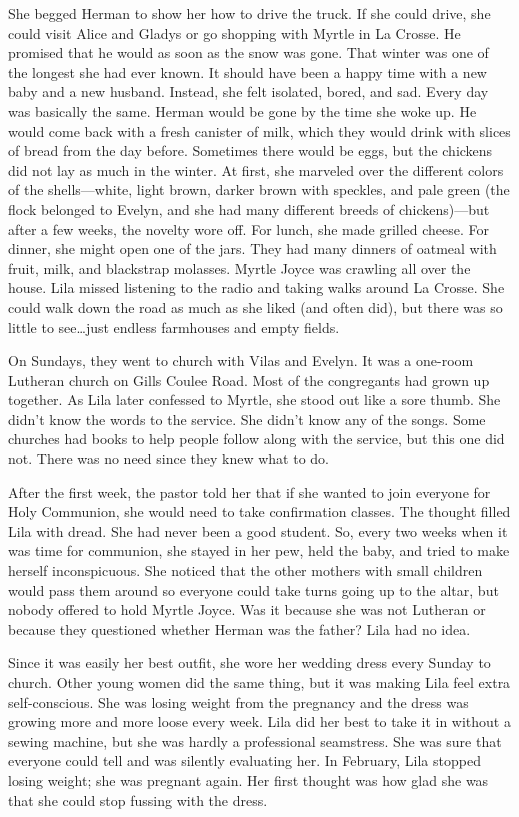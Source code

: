 \documentclass[
  letterpaper,
]{book}
\begin{document}
She begged Herman to show her how to drive the truck. If she could
drive, she could visit Alice and Gladys or go shopping with Myrtle in La
Crosse. He promised that he would as soon as the snow was gone. That
winter was one of the longest she had ever known. It should have been a
happy time with a new baby and a new husband. Instead, she felt
isolated, bored, and sad. Every day was basically the same. Herman would
be gone by the time she woke up. He would come back with a fresh
canister of milk, which they would drink with slices of bread from the
day before. Sometimes there would be eggs, but the chickens did not lay
as much in the winter. At first, she marveled over the different colors
of the shells---white, light brown, darker brown with speckles, and pale
green (the flock belonged to Evelyn, and she had many different breeds
of chickens)---but after a few weeks, the novelty wore off. For lunch,
she made grilled cheese. For dinner, she might open one of the jars.
They had many dinners of oatmeal with fruit, milk, and blackstrap
molasses. Myrtle Joyce was crawling all over the house. Lila missed
listening to the radio and taking walks around La Crosse. She could walk
down the road as much as she liked (and often did), but there was so
little to see\ldots just endless farmhouses and empty fields.

On Sundays, they went to church with Vilas and Evelyn. It was a one-room
Lutheran church on Gills Coulee Road. Most of the congregants had grown
up together. As Lila later confessed to Myrtle, she stood out like a
sore thumb. She didn't know the words to the service. She didn't know
any of the songs. Some churches had books to help people follow along
with the service, but this one did not. There was no need since they
knew what to do.

After the first week, the pastor told her that if she wanted to join
everyone for Holy Communion, she would need to take confirmation
classes. The thought filled Lila with dread. She had never been a good
student. So, every two weeks when it was time for communion, she stayed
in her pew, held the baby, and tried to make herself inconspicuous. She
noticed that the other mothers with small children would pass them
around so everyone could take turns going up to the altar, but nobody
offered to hold Myrtle Joyce. Was it because she was not Lutheran or
because they questioned whether Herman was the father? Lila had no idea.

Since it was easily her best outfit, she wore her wedding dress every
Sunday to church. Other young women did the same thing, but it was
making Lila feel extra self-conscious. She was losing weight from the
pregnancy and the dress was growing more and more loose every week. Lila
did her best to take it in without a sewing machine, but she was hardly
a professional seamstress. She was sure that everyone could tell and was
silently evaluating her. In February, Lila stopped losing weight; she
was pregnant again. Her first thought was how glad she was that she
could stop fussing with the dress.
\end{document}

